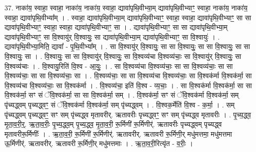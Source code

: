 \documentclass[17pt]{extarticle}
\begin{document}
37. नाका॑य॒ स्वाहा॒ स्वाहा॒ नाका॑य॒ नाका॑य॒ स्वाहा॒ द्यावा॑पृथि॒वीभ्या॒म् द्यावा॑पृथि॒वीभ्याꣳ॒॒ स्वाहा॒ नाका॑य॒ नाका॑य॒ स्वाहा॒ द्यावा॑पृथि॒वीभ्या᳚म् । . स्वाहा॒ द्यावा॑पृथि॒वीभ्या॒म् द्यावा॑पृथि॒वीभ्याꣳ॒॒ स्वाहा॒ स्वाहा॒ द्यावा॑पृथि॒वीभ्याꣳ॒॒ सा सा 
द्यावा॑पृथि॒वीभ्याꣳ॒॒ स्वाहा॒ स्वाहा॒ द्यावा॑पृथि॒वीभ्याꣳ॒॒ सा । . द्यावा॑पृथि॒वीभ्याꣳ॒॒ सा सा द्यावा॑पृथि॒वीभ्या॒म् द्यावा॑पृथि॒वीभ्याꣳ॒॒ सा वि॒श्वायु॑र् वि॒श्वायुः॒ सा द्यावा॑पृथि॒वीभ्या॒म् द्यावा॑पृथि॒वीभ्याꣳ॒॒ सा वि॒श्वायुः॑ । . द्यावा॑पृथि॒वीभ्या॒मिति॒ द्यावा᳚ - पृ॒थि॒वीभ्या᳚म् । . सा वि॒श्वायु॑र् वि॒श्वायुः॒ सा सा वि॒श्वायुः॒ सा सा वि॒श्वायुः॒ सा सा वि॒श्वायुः॒ सा । . वि॒श्वायुः॒ सा सा वि॒श्वायु॑र् वि॒श्वायुः॒ सा वि॒श्वव्य॑चा वि॒श्वव्य॑चाः॒ सा वि॒श्वायु॑र् वि॒श्वायुः॒ सा वि॒श्वव्य॑चाः । . वि॒श्वायु॒रिति॑ वि॒श्व - आ॒युः॒ । . सा वि॒श्वव्य॑चा वि॒श्वव्य॑चाः॒ सा सा वि॒श्वव्य॑चाः॒ सा सा वि॒श्वव्य॑चाः॒ सा सा वि॒श्वव्य॑चाः॒ सा । . वि॒श्वव्य॑चाः॒ सा सा वि॒श्वव्य॑चा वि॒श्वव्य॑चाः॒ सा वि॒श्वक॑र्मा वि॒श्वक॑र्मा॒ सा वि॒श्वव्य॑चा वि॒श्वव्य॑चाः॒ सा वि॒श्वक॑र्मा । . वि॒श्वव्य॑चा॒ इति॑ वि॒श्व - व्य॒चाः॒ । . सा वि॒श्वक॑र्मा वि॒श्वक॑र्मा॒ सा सा वि॒श्वक॑र्मा॒ सꣳ सं ॅवि॒श्वक॑र्मा॒ सा सा वि॒श्वक॑र्मा॒ सम् । . वि॒श्वक॑र्मा॒ सꣳ सं ॅवि॒श्वक॑र्मा वि॒श्वक॑र्मा॒ सम् पृ॑च्यद्ध्वम् पृच्यद्ध्वꣳ॒॒ सं ॅवि॒श्वक॑र्मा वि॒श्वक॑र्मा॒ सम् पृ॑च्यद्ध्वम् । . वि॒श्वक॒र्मेति॑ वि॒श्व - क॒र्मा॒ । . सम् पृ॑च्यद्ध्वम् पृच्यद्ध्वꣳ॒॒ सꣳ सम् पृ॑च्यद्ध्व मृतावरीर्. ऋतावरीः पृच्यद्ध्वꣳ॒॒ सꣳ सम् पृ॑च्यद्ध्व मृतावरीः । . पृ॒च्य॒द्ध्व॒ मृ॒ता॒व॒री॒र्॒. ऋ॒ता॒व॒रीः॒ पृ॒च्य॒द्ध्व॒म् पृ॒च्य॒द्ध्व॒ मृ॒ता॒व॒री॒ रू॒र्मिणी॑ रू॒र्मिणीर्॑. ऋतावरीः पृच्यद्ध्वम् पृच्यद्ध्व मृतावरीरू॒र्मिणीः᳚ । . ऋ॒ता॒व॒री॒ रू॒र्मिणी॑ रू॒र्मिणीर्॑. ऋतावरीर्. ऋतावरी रू॒र्मिणी॒र् मधु॑मत्तमा॒ मधु॑मत्तमा ऊ॒र्मिणीर्॑. ऋतावरीर्. ऋतावरी रू॒र्मिणी॒र् मधु॑मत्तमाः । . ऋ॒ता॒व॒री॒रित्यृ॑त - व॒रीः॒ । \newline
\end{document}
